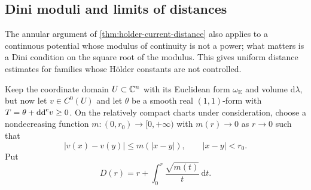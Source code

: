\subsection{Dini moduli and limits of distances}
\label{sec:dini-metric-distance}

The annular argument of \cref{thm:holder-current-distance} also applies to a continuous potential whose modulus of continuity is not a power; what matters is a Dini condition on the square root of the modulus. This gives uniform distance estimates for families whose H\"older constants are not controlled.

Keep the coordinate domain $U\subset\mathbb C^n$ with its Euclidean form $\omega_{\mathrm E}$ and volume $\mathrm{d}\lambda$, but now let $v\in C^0(U)$ and let $\theta$ be a smooth real $(1,1)$-form with $T=\theta+\mathrm{dd}^{\mathrm{c}} v\geq0$. On the relatively compact charts under consideration, choose a nondecreasing function $m\colon(0,r_0)\to[0,+\infty)$ with $m(r)\to0$ as $r\to0$ such that
\[
 |v(x)-v(y)|\leq m(|x-y|),\qquad |x-y|<r_0.
\]
Put
\begin{equation}\label{eq:dini-distance-modulus}
 D(r)=r+\int_0^r\frac{\sqrt{m(t)}}{t}\,\mathrm{d}t.
\end{equation}


